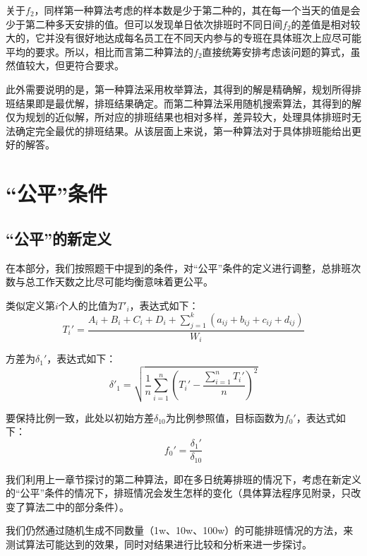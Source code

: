 \documentclass{article}
\begin{document}
	关于$f_2$，同样第一种算法考虑的样本数是少于第二种的，其在每一个当天的值是会少于第二种多天安排的值。但可以发现单日依次排班时不同日间$f_2$的差值是相对较大的，它并没有很好地达成每名员工在不同天内参与的专班在具体班次上应尽可能平均的要求。所以，相比而言第二种算法的$f_2$直接统筹安排考虑该问题的算式，虽然值较大，但更符合要求。
	
	此外需要说明的是，第一种算法采用枚举算法，其得到的解是精确解，规划所得排班结果即是最优解，排班结果确定。而第二种算法采用随机搜索算法，其得到的解仅为规划的近似解，所对应的排班结果也相对多样，差异较大，处理具体排班时无法确定完全最优的排班结果。从该层面上来说，第一种算法对于具体排班能给出更好的解答。
	
	\section{“公平”条件}
	\subsection{“公平”的新定义}
	在本部分，我们按照题干中提到的条件，对“公平”条件的定义进行调整，总排班次数与总工作天数之比尽可能均衡意味着更公平。
	
	类似定义第$i$个人的比值为$T'_i$，表达式如下：
	\begin{equation}
		T_i'=\frac{A_i+B_i+C_i+D_i+\sum_{j=1}^{k}(a_{ij}+b_{ij}+c_{ij}+d_{ij})}{W_i}
	\end{equation}
	
	方差为$\delta_1'$，表达式如下：
	\begin{equation}
		\delta'_1=\sqrt{\frac{1}{n}\sum_{i=1}^{n}(T_i'-\frac{\sum_{i=1}^{n}T_i'}{n})^2}
	\end{equation}
	
	要保持比例一致，此处以初始方差$\delta_{10}$为比例参照值，目标函数为$f_0'$，表达式如下：
	\begin{equation}
		f_0'=\frac{\delta_1'}{\delta_{10}}
	\end{equation}
	
	我们利用上一章节探讨的第二种算法，即在多日统筹排班的情况下，考虑在新定义的“公平”条件的情况下，排班情况会发生怎样的变化（具体算法程序见附录，只改变了算法二中的部分条件）。
	
	我们仍然通过随机生成不同数量（1w、10w、100w）的可能排班情况的方法，来测试算法可能达到的效果，同时对结果进行比较和分析来进一步探讨。
	
\end{document}
